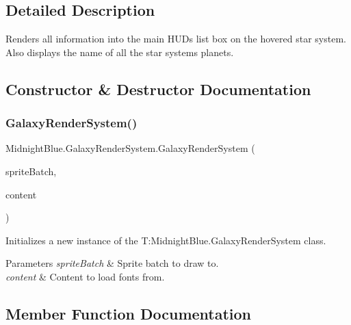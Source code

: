 \subsection{Detailed Description}
Renders all information into the main H\+UD\textquotesingle{}s list box on the hovered star system. Also displays the name of all the star systems planets. 



\subsection{Constructor \& Destructor Documentation}
\hypertarget{class_midnight_blue_1_1_galaxy_render_system_aee5d42f0287d1bfed669e2a2656c5c28}{}\label{class_midnight_blue_1_1_galaxy_render_system_aee5d42f0287d1bfed669e2a2656c5c28} 
\subsubsection{\texorpdfstring{Galaxy\+Render\+System()}{GalaxyRenderSystem()}}
{\footnotesize\ttfamily Midnight\+Blue.\+Galaxy\+Render\+System.\+Galaxy\+Render\+System (\begin{DoxyParamCaption}\item[{Sprite\+Batch}]{sprite\+Batch,  }\item[{Content\+Manager}]{content }\end{DoxyParamCaption})\hspace{0.3cm}{\ttfamily [inline]}}



Initializes a new instance of the T\+:\+Midnight\+Blue.\+Galaxy\+Render\+System class. 


\begin{DoxyParams}{Parameters}
{\em sprite\+Batch} & Sprite batch to draw to.\\
\hline
{\em content} & Content to load fonts from.\\
\hline
\end{DoxyParams}


\subsection{Member Function Documentation}
\hypertarget{class_midnight_blue_1_1_galaxy_render_system_a269f042fe0c55e47f3b23cc1930ed71a}{}\label{class_midnight_blue_1_1_galaxy_render_system_a269f042fe0c55e47f3b23cc1930ed71a} 
